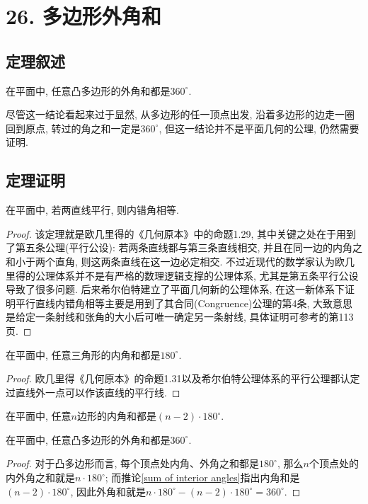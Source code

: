 \documentclass[main]{subfiles}
\begin{document}
	\renewcommand{\filename}{26. 多边形外角和}%
\section*{26. 多边形外角和}
\subsection*{定理叙述}
	在平面中, 任意凸多边形的外角和都是$360^{\circ}$.
	
	尽管这一结论看起来过于显然, 从多边形的任一顶点出发, 沿着多边形的边走一圈回到原点, 转过的角之和一定是$360^{\circ}$, 但这一结论并不是平面几何的公理, 仍然需要证明.
\subsection*{定理证明}
	\begin{theorem}\label{key}
		在平面中, 若两直线平行, 则内错角相等.
	\end{theorem}
	\begin{proof}
		该定理就是欧几里得的《几何原本》\cite{Euclid}中的命题1.29, 其中关键之处在于用到了{\kaishu 第五条公理(平行公设)}: 若两条直线都与第三条直线相交, 并且在同一边的内角之和小于两个直角, 则这两条直线在这一边必定相交. 不过近现代的数学家认为欧几里得的公理体系并不是有严格的数理逻辑支撑的公理体系, 尤其是第五条平行公设导致了很多问题. 后来希尔伯特建立了平面几何新的公理体系\cite{Hilbert}, 在这一新体系下证明平行直线内错角相等主要是用到了其{\kaishu 合同(Congruence)公理的第4条}, 大致意思是给定一条射线和张角的大小后可唯一确定另一条射线, 具体证明可参考\cite{Hartshorne}的第113页.
	\end{proof}
	
	\begin{theorem}
		在平面中, 任意三角形的内角和都是$180^{\circ}$.
	\end{theorem}
	\begin{proof}
		欧几里得《几何原本》\cite{Euclid}的命题1.31以及希尔伯特公理体系\cite{Hilbert}的平行公理都认定过直线外一点可以作该直线的平行线.
	\end{proof}
	
	\begin{corollary}\label{sum of interior angles}
		在平面中, 任意$n$边形的内角和都是$(n-2)\cdot 180^{\circ}$.
	\end{corollary}
	
	\begin{corollary}
		在平面中, 任意凸多边形的外角和都是$360^{\circ}$.
	\end{corollary}
	\begin{proof}
		对于凸多边形而言, 每个顶点处内角、外角之和都是$180^{\circ}$, 那么$n$个顶点处的内外角之和就是$n\cdot 180^{\circ}$; 而推论\ref{sum of interior angles}指出内角和是$(n-2)\cdot 180^{\circ}$, 因此外角和就是$n\cdot 180^{\circ}-(n-2)\cdot 180^{\circ}=360^{\circ}$.
	\end{proof}
	
\end{document}
